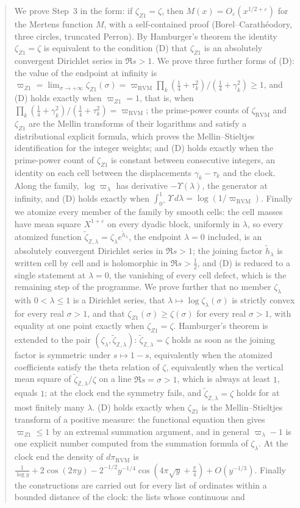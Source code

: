 \documentclass[11pt,reqno]{amsart}
\numberwithin{equation}{section}
\theoremstyle{plain}
\theoremstyle{definition}
\theoremstyle{remark}
\newcommand{\Z}{\mathbb Z}
\newcommand{\eps}{\varepsilon}
\newcommand{\RVM}{\mathrm{RVM}}
\begin{document}
\begin{abstract}
We prove Step~3 in the form: if $\zeta_{Z1}=\zeta$, then $M(x)=O_\eps(x^{1/2+\eps})$ for the Mertens function $M$, with a self-contained proof (Borel--Carath\'eodory, three circles, truncated Perron).  By Hamburger's theorem the identity $\zeta_{Z1}=\zeta$ is equivalent to the condition (D) that $\zeta_{Z1}$ is an absolutely convergent Dirichlet series in $\Re s>1$.  We prove three further forms of (D): the value of the endpoint at infinity is $\varpi_{Z1}=\lim_{\sigma\to+\infty}\zeta_{Z1}(\sigma)=\varpi_{\RVM}\prod_k(\frac14+\tau_k^2)/(\frac14+\gamma_k^2)\ge1$, and (D) holds exactly when $\varpi_{Z1}=1$, that is, when $\prod_k(\frac14+\gamma_k^2)/(\frac14+\tau_k^2)=\varpi_{\RVM}$; the prime-power counts of $\zeta_{\RVM}$ and $\zeta_{Z1}$ are the Mellin transforms of their logarithms and satisfy a distributional explicit formula, which proves the Mellin--Stieltjes identification for the integer weights; and (D) holds exactly when the prime-power count of $\zeta_{Z1}$ is constant between consecutive integers, an identity on each cell between the displacements $\gamma_k-\tau_k$ and the clock.  Along the family, $\log\varpi_\lambda$ has derivative $-\Upsilon(\lambda)$, the generator at infinity, and (D) holds exactly when $\int_{0^+}^1\Upsilon\,d\lambda=\log(1/\varpi_{\RVM})$.  Finally we atomize every member of the family by smooth cells: the cell masses have mean square $X^{1+\eps}$ on every dyadic block, uniformly in $\lambda$, so every atomized function $\tilde\zeta_{\Z,\lambda}=\zeta_\lambda e^{\tilde h_\lambda}$, the endpoint $\lambda=0$ included, is an absolutely convergent Dirichlet series in $\Re s>1$; the joining factor $\tilde h_\lambda$ is written cell by cell and is holomorphic in $\Re s>\frac12$, and (D) is reduced to a single statement at $\lambda=0$, the vanishing of every cell defect, which is the remaining step of the programme.  We prove further that no member $\zeta_\lambda$ with $0<\lambda\le1$ is a Dirichlet series, that $\lambda\mapsto\log\zeta_\lambda(\sigma)$ is strictly convex for every real $\sigma>1$, and that $\zeta_{Z1}(\sigma)\ge\zeta(\sigma)$ for every real $\sigma>1$, with equality at one point exactly when $\zeta_{Z1}=\zeta$.  Hamburger's theorem is extended to the pair $(\zeta_\lambda,\tilde\zeta_{\Z,\lambda})$: $\tilde\zeta_{\Z,\lambda}=\zeta$ holds as soon as the joining factor is symmetric under $s\mapsto1-s$, equivalently when the atomized coefficients satisfy the theta relation of $\zeta$, equivalently when the vertical mean square of $\tilde\zeta_{\Z,\lambda}/\zeta$ on a line $\Re s=\sigma>1$, which is always at least $1$, equals $1$; at the clock end the symmetry fails, and $\tilde\zeta_{\Z,\lambda}=\zeta$ holds for at most finitely many $\lambda$.  (D) holds exactly when $\zeta_{Z1}$ is the Mellin--Stieltjes transform of a positive measure: the functional equation then gives $\varpi_{Z1}\le1$ by an extremal summation argument, and in general $\varpi_\lambda-1$ is one explicit number computed from the summation formula of $\zeta_\lambda$.  At the clock end the density of $d\pi_{\RVM}$ is $\frac1{\log y}+2\cos(2\pi y)-2^{-1/2}y^{-1/4}\cos(4\pi\sqrt y+\frac\pi4)+O(y^{-1/3})$.  Finally the constructions are carried out for every list of ordinates within a bounded distance of the clock: the lists whose continuous and 
\end{abstract}
\end{document}

